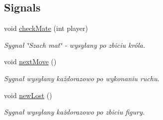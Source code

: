 \subsection*{Signals}
\begin{DoxyCompactItemize}
\item 
\mbox{\label{classchess_board_acc9cef750420c74bfc72b07a94799c7b}} 
void \hyperlink{classchess_board_acc9cef750420c74bfc72b07a94799c7b}{check\+Mate} (int player)
\begin{DoxyCompactList}\small\item\em Sygnał \char`\"{}\+Szach mat\char`\"{} -\/ wysyłany po zbiciu króla. \end{DoxyCompactList}\item 
\mbox{\label{classchess_board_a20775bae5ea49615cf79615d01f9f469}} 
void \hyperlink{classchess_board_a20775bae5ea49615cf79615d01f9f469}{next\+Move} ()
\begin{DoxyCompactList}\small\item\em Sygnał wysyłany każdorazowo po wykonaniu ruchu. \end{DoxyCompactList}\item 
\mbox{\label{classchess_board_ab353f1caafb54b0efa14621a38687711}} 
void \hyperlink{classchess_board_ab353f1caafb54b0efa14621a38687711}{new\+Lost} ()
\begin{DoxyCompactList}\small\item\em Sygnał wysyłany każdorazowo po zbiciu figury. \end{DoxyCompactList}\end{DoxyCompactItemize}
